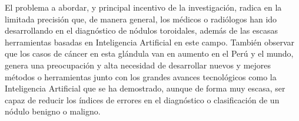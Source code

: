 El problema a abordar, y principal incentivo de la investigación, radica en la limitada precisión que, de manera general, los médicos o radiólogos han ido desarrollando en el diagnóstico de nódulos toroidales, además de las escasas herramientas basadas en Inteligencia Artificial en este campo. También observar que los casos de cáncer en esta glándula van en aumento en el Perú y el mundo, genera una preocupación y alta necesidad de desarrollar nuevos y mejores métodos o herramientas junto con los grandes avances tecnológicos como la Inteligencia Artificial que se ha demostrado, aunque de forma muy escasa, ser capaz de reducir los índices de errores en el diagnóstico o clasificación de un nódulo benigno o maligno.
